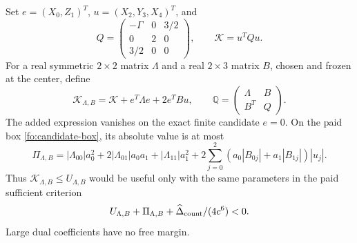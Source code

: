 \documentclass[11pt]{article}
\numberwithin{equation}{section}
\theoremstyle{definition}
\theoremstyle{remark}
\begin{document}
Set $e=(X_0,Z_1)^T$, $u=(X_2,Y_3,X_4)^T$, and
\begin{equation}
Q=\begin{pmatrix}-\Gamma&0&3/2\\0&2&0\\3/2&0&0\end{pmatrix},
\qquad \mathcal K=u^TQu.
\end{equation}
For a real symmetric $2\times2$ matrix $\Lambda$ and a real
$2\times3$ matrix $B$, chosen and frozen at the center, define
\begin{equation}
\mathcal K_{\Lambda,B}=\mathcal K+e^T\Lambda e+2e^TBu,
\qquad
\mathbb Q=\begin{pmatrix}\Lambda&B\\B^T&Q\end{pmatrix}.
\label{fo:dual-definition}
\end{equation}
The added expression vanishes on the exact finite candidate $e=0$.
On the paid box \eqref{fo:candidate-box}, its absolute value is at most
\begin{equation}
\Pi_{\Lambda,B}=
|\Lambda_{00}|a_0^2+2|\Lambda_{01}|a_0a_1+|\Lambda_{11}|a_1^2
 +2\sum_{j=0}^2(a_0|B_{0j}|+a_1|B_{1j}|)|u_j|.
\label{fo:box-dual-payment}
\end{equation}
Thus $\mathcal K_{\Lambda,B}\le U_{\Lambda,B}$ would be useful only
with the same parameters in the paid sufficient criterion
\begin{equation}
U_{\Lambda,B}+\Pi_{\Lambda,B}
                +\widehat\Delta_{\rm count}/(4c^6)<0.
\end{equation}
Large dual coefficients have no free margin.
\end{document}
